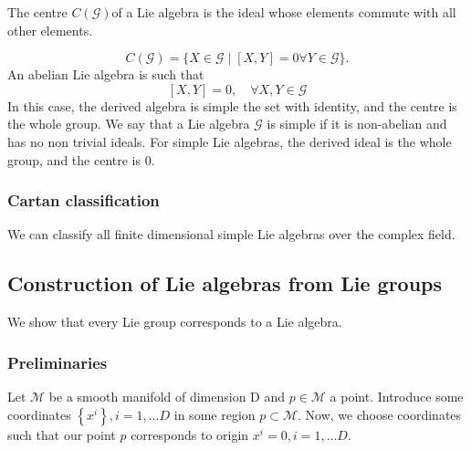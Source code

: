 \documentclass[11pt, oneside]{article}   	%
\theoremstyle{slanted}
\newcommand{\lalg}{ \mathcal{ G } }
\begin{document}
The centre $C(\mathcal{G})$of a Lie algebra is the ideal whose elements commute with all other elements. 

\[ 
	C(\mathcal{G}) = \{ X \in \mathcal{G} \mid [X, Y] = 0 \forall Y \in \mathcal{G} \}.  
\]  An abelian Lie algebra is such that 
\[
	 [X, Y]= 0, \quad \forall X, Y \in \lalg
\] In this case, the derived algebra is simple the set with identity, and the centre is the whole group. We say that a Lie algebra $\lalg$ is simple if it is non-abelian and has no non trivial ideals. For simple Lie algebras, the derived ideal is the whole group, and the centre is 0. 

\subsubsection{Cartan classification} 
We can classify all finite dimensional simple Lie algebras over the complex field. 

\subsection{Construction of Lie algebras from Lie groups}
We show that every Lie group corresponds to a Lie algebra.

\subsubsection{Preliminaries} 
Let $ \mathcal{ M } $ be a smooth manifold of dimension D and $ p \in \mathcal{ M }$ a point. Introduce some coordinates $ \left\{  x^{ i  } \right\}, i = 1, \dots D $ in some region $ p \subset \mathcal{ M }$. Now, we choose coordinates such that our point $ p $ corresponds to origin $ x^{ i }  = 0 , i = 1, \dots D$. 
\end{document}
